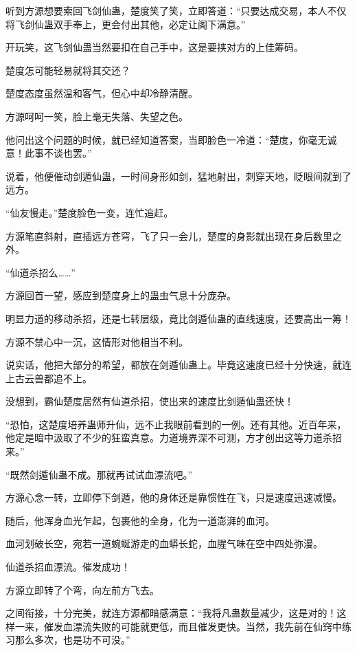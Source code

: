 
\begin{this_body}

听到方源想要索回飞剑仙蛊，楚度笑了笑，立即答道：“只要达成交易，本人不仅将飞剑仙蛊双手奉上，更会付出其他，必定让阁下满意。”

开玩笑，这飞剑仙蛊当然要扣在自己手中，这是要挟对方的上佳筹码。

楚度怎可能轻易就将其交还？

楚度态度虽然温和客气，但心中却冷静清醒。

方源呵呵一笑，脸上毫无失落、失望之色。

他问出这个问题的时候，就已经知道答案，当即脸色一冷道：“楚度，你毫无诚意！此事不谈也罢。”

说着，他便催动剑遁仙蛊，一时间身形如剑，猛地射出，刺穿天地，眨眼间就到了远方。

“仙友慢走。”楚度脸色一变，连忙追赶。

方源笔直斜射，直插远方苍穹，飞了只一会儿，楚度的身影就出现在身后数里之外。

“仙道杀招么……”

方源回首一望，感应到楚度身上的蛊虫气息十分庞杂。

明显力道的移动杀招，还是七转层级，竟比剑遁仙蛊的直线速度，还要高出一筹！

方源不禁心中一沉，这情形对他相当不利。

说实话，他把大部分的希望，都放在剑遁仙蛊上。毕竟这速度已经十分快速，就连上古云兽都追不上。

没想到，霸仙楚度居然有仙道杀招，使出来的速度比剑遁仙蛊还快！

“恐怕，这楚度培养蛊师升仙，远不止我眼前看到的一例。还有其他。近百年来，他定是暗中汲取了不少的狂蛮真意。力道境界深不可测，方才创出这等力道杀招来。”

“既然剑遁仙蛊不成。那就再试试血漂流吧。”

方源心念一转，立即停下剑遁，他的身体还是靠惯性在飞，只是速度迅速减慢。

随后，他浑身血光乍起，包裹他的全身，化为一道澎湃的血河。

血河划破长空，宛若一道蜿蜒游走的血蟒长蛇，血腥气味在空中四处弥漫。

仙道杀招血漂流。催发成功！

方源立即转了个弯，向左前方飞去。

之间衔接，十分完美，就连方源都暗感满意：“我将凡蛊数量减少，这是对的！这样一来，催发血漂流失败的可能就更低，而且催发更快。当然，我先前在仙窍中练习那么多次，也是功不可没。”


\end{this_body}
